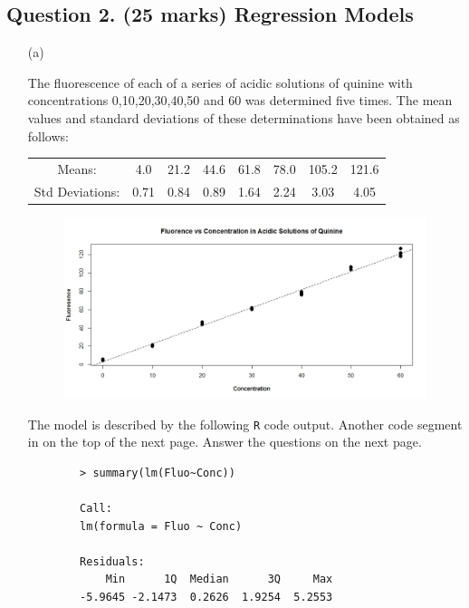 \documentclass[a4paper,12pt]{article}
\begin{document}
\subsection*{Question 2. (25 marks) Regression Models }
\begin{itemize}


\item[(a)] 


The fluorescence of each of a series of acidic solutions of quinine with concentrations 0,10,20,30,40,50 and 60
was determined five times. The mean values and standard deviations of these determinations have
been obtained as follows:
\begin{center}
	\begin{tabular}{|c|ccccccc|}
		\hline
		Means: & 4.0 & 21.2& 44.6& 61.8& 78.0 &105.2&121.6\\
		Std Deviations: &0.71& 0.84 &0.89 &1.64 &2.24 &3.03&4.05\\
		\hline
	\end{tabular}
\end{center}


\begin{figure}[h!]
	\centering
	\includegraphics[width=0.7\linewidth]{images/Q2-Quinine}
	\caption{}
	\label{fig:Q2-Quinine}
\end{figure}

The model is described by the following \texttt{R} code output. Another code segment in on the top of the next page. Answer the questions on the next page.


\begin{framed}
	\begin{verbatim}
		> summary(lm(Fluo~Conc))
		
		Call:
		lm(formula = Fluo ~ Conc)
		
		Residuals:
		    Min      1Q  Median      3Q     Max 
		-5.9645 -2.1473  0.2626  1.9254  5.2553 
		

\end{verbatim}
\end{framed}
\end{itemize}
\end{document}
